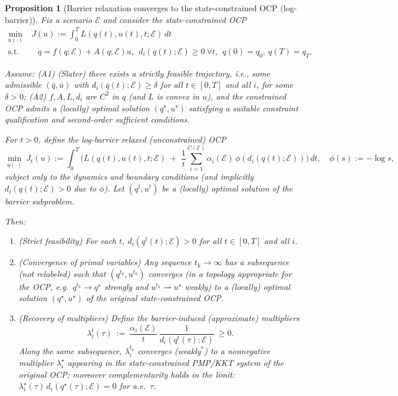 \documentclass{article} %
\newtheorem{proposition}[theorem]{Proposition}
\begin{document}
\begin{proposition}[Barrier relaxation converges to the state-constrained OCP (log-barrier)]
\label{prop:barrier_convergence}
Fix a scenario $\mathcal E$ and consider the state-constrained OCP
\begin{equation}
\begin{aligned}
\min_{u(\cdot)}&\ J(u):=\int_0^T L(q(t),u(t),t;\mathcal E)\,dt
\\ \text{s.t.}&\quad
\dot q=f(q;\mathcal E)+A(q;\mathcal E)u,\ \ d_i(q(t);\mathcal E)\ge 0\ \forall t,\ \ q(0)=q_0,\ q(T)=q_T.    
\end{aligned}
\end{equation}

Assume:
(A1) (\emph{Slater}) there exists a strictly feasible trajectory, i.e., some admissible $(\bar q,\bar u)$ with
$d_i(\bar q(t);\mathcal E)\ge \delta$ for all $t\in[0,T]$ and all $i$, for some $\delta>0$;
(A2) $f,A,L,d_i$ are $C^2$ in $q$ (and $L$ is convex in $u$), and the constrained OCP admits a (locally) optimal solution
$(q^\star,u^\star)$ satisfying a suitable constraint qualification and second-order sufficient conditions.

For $t>0$, define the \emph{log-barrier relaxed} (unconstrained) OCP
\[
\min_{u(\cdot)}\ J_t(u):=\int_0^T \Big(
L(q(t),u(t),t;\mathcal E)\;+\;\frac{1}{t}\sum_{i=1}^{C(\mathcal E)} \alpha_i(\mathcal E)\, \phi(d_i(q(t);\mathcal E))
\Big)\,dt,
\quad
\phi(s):=-\log s,
\]
subject only to the dynamics and boundary conditions (and implicitly $d_i(q(t);\mathcal E)>0$ due to $\phi$).
Let $(q^t,u^t)$ be a (locally) optimal solution of the barrier subproblem.

Then:
\begin{enumerate}
\item (\emph{Strict feasibility}) For each $t$, $d_i(q^t(t);\mathcal E)>0$ for all $t\in[0,T]$ and all $i$.
\item (\emph{Convergence of primal variables}) Any sequence $t_k\to\infty$ has a subsequence (not relabeled) such that
$(q^{t_k},u^{t_k})$ converges (in a topology appropriate for the OCP, e.g.\ $q^{t_k}\to q^\star$ strongly and $u^{t_k}\rightharpoonup u^\star$ weakly)
to a (locally) optimal solution $(q^\star,u^\star)$ of the original state-constrained OCP.
\item (\emph{Recovery of multipliers}) Define the barrier-induced (approximate) multipliers
\[
\lambda_i^t(\tau)\ :=\ \frac{\alpha_i(\mathcal E)}{t}\,\frac{1}{d_i(q^t(\tau);\mathcal E)}\ \ge 0.
\]
Along the same subsequence, $\lambda_i^{t_k}$ converges (weakly$^\ast$) to a nonnegative multiplier $\lambda_i^\star$
appearing in the state-constrained PMP/KKT system of the original OCP; moreover complementarity holds in the limit:
$\lambda_i^\star(\tau)\,d_i(q^\star(\tau);\mathcal E)=0$ for a.e.\ $\tau$.
\end{enumerate}
\end{proposition}
\end{document}
